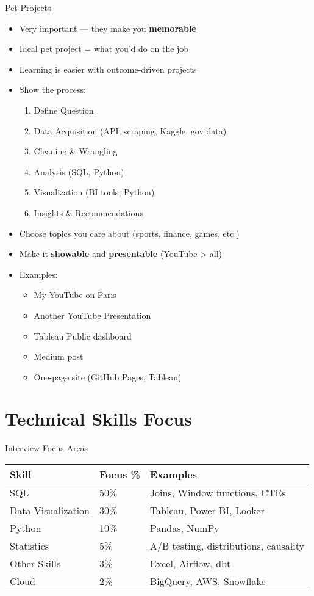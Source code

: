 \documentclass[10pt,a4paper]{article}
\begin{document}
\begin{multicols}{3}
\begin{textbox}{Pet Projects}
\begin{itemize}
    \item Very important — they make you \textbf{memorable}
    \item Ideal pet project = what you'd do on the job
    \item Learning is easier with outcome-driven projects
    \item Show the process:
    \begin{enumerate}
        \item Define Question
        \item Data Acquisition (API, scraping, Kaggle, gov data)
        \item Cleaning & Wrangling
        \item Analysis (SQL, Python)
        \item Visualization (BI tools, Python)
        \item Insights & Recommendations
    \end{enumerate}
    \item Choose topics you care about (sports, finance, games, etc.)
    \item Make it \textbf{showable} and \textbf{presentable} (YouTube > all)
    \item Examples:
    \begin{itemize}
        \item My YouTube on Paris
        \item Another YouTube Presentation
        \item Tableau Public dashboard
        \item Medium post
        \item One-page site (GitHub Pages, Tableau)
    \end{itemize}
\end{itemize}
\end{textbox}

\section{Technical Skills Focus}

\begin{textbox}{Interview Focus Areas}
\begin{tabular}{l|l|l}
\textbf{Skill} & \textbf{Focus \%} & \textbf{Examples} \\
\hline
SQL & 50\% & Joins, Window functions, CTEs \\
Data Visualization & 30\% & Tableau, Power BI, Looker \\
Python & 10\% & Pandas, NumPy \\
Statistics & 5\% & A/B testing, distributions, causality \\
Other Skills & 3\% & Excel, Airflow, dbt \\
Cloud & 2\% & BigQuery, AWS, Snowflake \\
\end{tabular}
\end{textbox}


\end{multicols}
\end{document}
